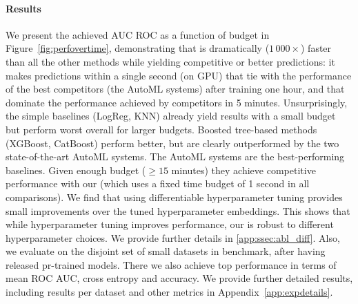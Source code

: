 \documentclass{article}
\newcommand{\sam}[1]{\todo[inline,color=green]{Sam: #1}}
\begin{document}
\paragraph{Results}
%
We present the achieved AUC ROC as a function of budget in Figure~\ref{fig:perfovertime},
%
demonstrating that \methodname{} is dramatically ($1\,000\times$) faster than all the other methods while yielding competitive or better predictions: it makes predictions within a single second (on GPU) that tie with the performance of the best competitors (the AutoML systems) after training one hour, and that dominate the performance achieved by competitors in 5 minutes.
Unsurprisingly, the simple baselines (LogReg, KNN) already yield results with a small budget but perform worst overall for larger budgets.
Boosted tree-based methods (XGBoost, CatBoost) perform better, but are clearly outperformed by the two state-of-the-art AutoML systems. The AutoML systems are the best-performing baselines. Given enough budget ($\ge 15$ minutes) they achieve competitive performance with our \methodname{} (which uses a fixed time budget of 1 second in all comparisons). We find that using differentiable hyperparameter tuning provides small improvements over the tuned hyperparameter embeddings. This shows that while hyperparameter tuning improves performance, our \methodname{} is robust to different hyperparameter choices. We provide further details in \ref{app:ssec:abl_diff}. Also, we evaluate \methodname{} on the disjoint set of small datasets in \openmlautoml{} benchmark, after having released pr-trained models. There we also achieve top performance in terms of mean ROC AUC, cross entropy and accuracy.
%
We provide further detailed results, including results per dataset and other metrics in Appendix~\ref{app:expdetails}.

\end{document}
